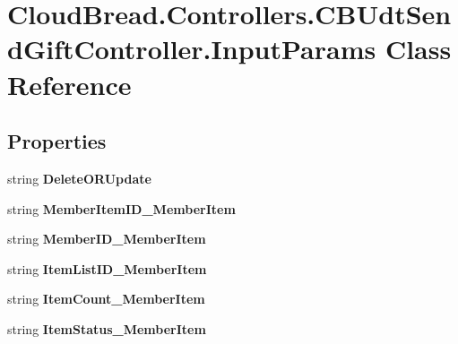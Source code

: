 \hypertarget{a00116}{}\section{Cloud\+Bread.\+Controllers.\+C\+B\+Udt\+Send\+Gift\+Controller.\+Input\+Params Class Reference}
\label{a00116}
\subsection*{Properties}
\begin{DoxyCompactItemize}
\item 
string {\bfseries Delete\+O\+R\+Update}\hypertarget{a00116_a48e14d1db508ef473eabb83c02664002}{}\label{a00116_a48e14d1db508ef473eabb83c02664002}

\item 
string {\bfseries Member\+Item\+I\+D\+\_\+\+Member\+Item}\hypertarget{a00116_a0f37d462eb2b25f4729dd765cefb00c5}{}\label{a00116_a0f37d462eb2b25f4729dd765cefb00c5}

\item 
string {\bfseries Member\+I\+D\+\_\+\+Member\+Item}\hypertarget{a00116_ab83c0b39c4d2cb9f2f845bc5c6e3d9e8}{}\label{a00116_ab83c0b39c4d2cb9f2f845bc5c6e3d9e8}

\item 
string {\bfseries Item\+List\+I\+D\+\_\+\+Member\+Item}\hypertarget{a00116_a9860cf674593ea6547687995dae6bba9}{}\label{a00116_a9860cf674593ea6547687995dae6bba9}

\item 
string {\bfseries Item\+Count\+\_\+\+Member\+Item}\hypertarget{a00116_a9637e41bd74143a5c4349d6dca56c7ce}{}\label{a00116_a9637e41bd74143a5c4349d6dca56c7ce}

\item 
string {\bfseries Item\+Status\+\_\+\+Member\+Item}\hypertarget{a00116_ae8befffcc39665e017117fd99a8f6aaa}{}\label{a00116_ae8befffcc39665e017117fd99a8f6aaa}


\end{DoxyCompactItemize}
